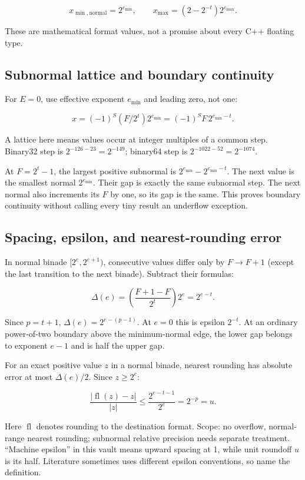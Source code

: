 \[
x_{\min,\mathrm{normal}}=2^{e_{\min}},\qquad
x_{\max}=(2-2^{-t})2^{e_{\max}}.
\]

These are mathematical format values, not a promise about every C++ floating type.

\subsection{Subnormal lattice and boundary continuity}\label{03-visual-computing-i-ch018-subnormal-lattice-and-boundary-continuity}

For \(E=0\), use effective exponent \(e_{\min}\) and leading zero, not one:

\[
x=(-1)^S(F/2^t)2^{e_{\min}}=(-1)^S F\,2^{e_{\min}-t}.
\]

A lattice here means values occur at integer multiples of a common step. Binary32 step is \(2^{-126-23}=2^{-149}\); binary64 step is \(2^{-1022-52}=2^{-1074}\).

At \(F=2^t-1\), the largest positive subnormal is \(2^{e_{\min}}-2^{e_{\min}-t}\). The next value is the smallest normal \(2^{e_{\min}}\). Their gap is exactly the same subnormal step. The next normal also increments its \(F\) by one, so its gap is the same. This proves boundary continuity without calling every tiny result an underflow exception.

\subsection{Spacing, epsilon, and nearest-rounding error}\label{03-visual-computing-i-ch018-spacing-epsilon-and-nearest-rounding-error}

In normal binade \([2^e,2^{e+1})\), consecutive values differ only by \(F\to F+1\) (except the last transition to the next binade). Subtract their formulas:

\[
\Delta(e)=\left(\frac{F+1-F}{2^t}\right)2^e=2^{e-t}.
\]

Since \(p=t+1\), \(\Delta(e)=2^{e-(p-1)}\). At \(e=0\) this is epsilon \(2^{-t}\). At an ordinary power-of-two boundary above the minimum-normal edge, the lower gap belongs to exponent \(e-1\) and is half the upper gap.

For an exact positive value \(z\) in a normal binade, nearest rounding has absolute error at most \(\Delta(e)/2\). Since \(z\ge2^e\):

\[
\frac{|\operatorname{fl}(z)-z|}{|z|}
\le\frac{2^{e-t-1}}{2^e}=2^{-p}=u.
\]

Here \(\operatorname{fl}\) denotes rounding to the destination format. Scope: no overflow, normal-range nearest rounding; subnormal relative precision needs separate treatment. ``Machine epsilon'' in this vault means upward spacing at 1, while unit roundoff \(u\) is its half. Literature sometimes uses different epsilon conventions, so name the definition.

